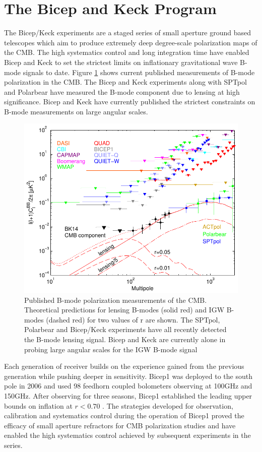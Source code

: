 \documentclass[12pt]{article}
\begin{document}
\section{The Bicep and Keck Program}
The Bicep/Keck experiments are a staged series of small aperture ground based
telescopes which aim to produce extremely deep degree-scale polarization maps
of the CMB. The high systematics control and long integration time have
enabled Bicep and Keck to set the strictest limits on inflationary
gravitational wave B-mode signals to date. Figure \ref{fig:BK_vs_world} shows
current published measurements of B-mode polarization in the CMB. The Bicep
and Keck experiments along with SPTpol and Polarbear have measured the B-mode
component due to lensing at high significance. Bicep and Keck have currently
published the strictest constraints on B-mode measurements on large angular
scales.

\begin{figure}
	\center
	\includegraphics[width=.7\textwidth]{bk14_vs_world.pdf}
	\caption{Published B-mode polarization measurements of the CMB.
	Theoretical predictions for lensing B-modes (solid red) and IGW B-modes
	(dashed red) for two values of r are shown. The SPTpol, Polarbear and
	Bicep/Keck experiments have all recently detected the B-mode lensing
	signal. Bicep and Keck are currently alone in probing large
	angular scales for the IGW B-mode signal}
	\label{fig:BK_vs_world}
\end{figure}


Each generation of receiver builds on the experience gained from
the previous generation while pushing deeper in sensitivity.
Bicep1 was deployed to the south pole in 2006 and used 98 feedhorn coupled
bolometers observing at 100GHz and 150GHz. After observing for three seasons,
Bicep1 established the leading  upper bounds on inflation at $r<0.70$
\cite{cite:Bicep1}. The strategies developed for observation, calibration and
systematics control during the operation of Bicep1 proved the efficacy of
small aperture refractors for CMB polarization studies and have enabled the
high systematics control achieved by subsequent experiments in the series.
\end{document}
